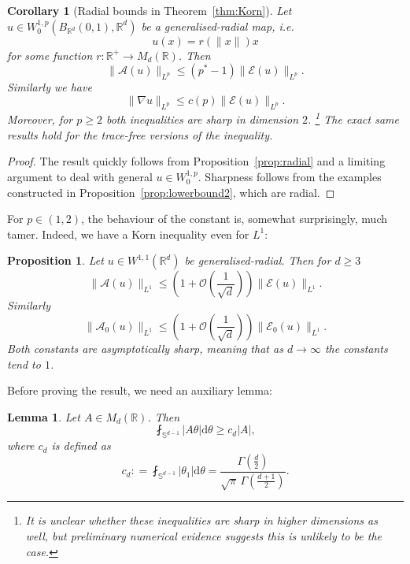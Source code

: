 \documentclass[11pt, a4paper]{amsart}
\newtheorem{proposition}{Proposition}[section]
\newtheorem{corollary}{Corollary}[theorem]
\newtheorem{lemma}[theorem]{Lemma}
\theoremstyle{definition}
\theoremstyle{remark}
\newcommand{\R}{\mathbb{R}}
\begin{document}
\begin{corollary}[Radial bounds in
Theorem~\ref{thm:Korn}]
Let $u\in W^{1,p}_0(B_{\R^d}(0,1),\R^d)$ be a
generalised-radial map, i.e.
\begin{equation*}
u(x)=r(\|x\|)x
\end{equation*}
for some function $r\colon\R^+\to M_d(\R)$. Then
\begin{equation*}
\|\mathcal A(u)\|_{L^p}
\le (p^*-1)\|\mathcal E(u)\|_{L^p}.
\end{equation*}
Similarly we have
\begin{equation*}
\|\nabla u\|_{L^p}\le c(p)\|\mathcal E(u)\|_{L^p}.
\end{equation*}
Moreover, for $p\ge 2$ both inequalities are sharp
in dimension $2$.
\footnote{It is unclear whether these inequalities
are sharp in higher dimensions as well,
but preliminary numerical evidence suggests
this is unlikely to be the case.}
The exact same results hold for the trace-free
versions of the inequality.
\end{corollary}
\begin{proof}
The result quickly follows
from Proposition~\ref{prop:radial}
and a limiting argument to deal with
general $u\in W^{1,p}_0$. 
Sharpness follows from the examples constructed
in Proposition~\ref{prop:lowerbound2}, which are radial.
\end{proof}
For $p\in (1,2)$, the 
behaviour of the constant
is, somewhat surprisingly,
much tamer. Indeed, 
we have a Korn inequality
even for $L^1$:
\begin{proposition}
Let $u\in W^{1,1}(\R^d)$ be generalised-radial.
Then for $d\ge 3$
\begin{equation*}
\|\mathcal A(u)\|_{L^1}\le
\left(1+\mathcal O\left(\frac1{\sqrt d}\right)\right)
\|\mathcal E(u)\|_{L^1}.
\end{equation*}
Similarly
\begin{equation*}
\|\mathcal A_0(u)\|_{L^1}
\le \left(1+\mathcal O
\left(\frac1{\sqrt d}\right)\right)
\|\mathcal E_0(u)\|_{L^1}.
\end{equation*}
Both constants are asymptotically sharp,
meaning that as $d\to \infty$ the constants
tend to $1$.
\end{proposition}
Before proving the result, we need an auxiliary lemma:
\begin{lemma}\label{lemma:integralmatrix}
Let $A\in M_d(\R)$. Then
\begin{equation*}
\fint_{\mathbb{S}^{d-1}}|A\theta|\mathrm d\theta
\ge c_d |A|,
\end{equation*}
where $c_d$ is defined as
\begin{equation*}
c_d\mathrel{:}=\fint_{\mathbb{S}^{d-1}}
|\theta_1|\mathrm{d}\theta
=\frac{\Gamma(\frac d2)}
{\sqrt\pi\,\Gamma(\frac{d+1}{2})}.
\end{equation*}
\end{lemma}
\end{document}

